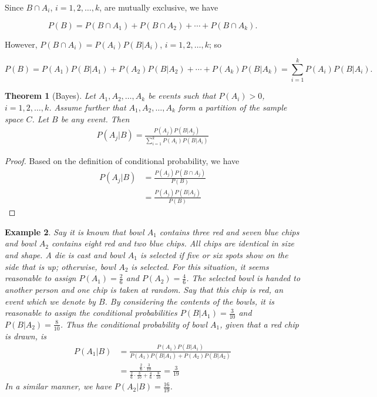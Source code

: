 \documentclass[12pt]{article}
\newtheorem{theorem}{Theorem}[section]
\newtheorem{example}[theorem]{Example}
\newcommand{\1}{{\bf 1}}
\newcommand{\2}{{\bf 2}}
\begin{document}
Since $B \cap A_i$, $i = 1, 2, \ldots, k$, are mutually exclusive, we have

\[ P(B) = P(B \cap A_1) + P(B \cap A_2) + \cdots + P(B \cap A_k). \]

However, $P(B \cap A_i) = P(A_i)P(B|A_i)$, $i = 1, 2, \ldots, k$; so

\[ P(B) = P(A_1)P(B|A_1) + P(A_2)P(B|A_2) + \cdots + P(A_k)P(B|A_k) = \sum_{i=1}^{k} P(A_i)P(B|A_i). \]

\begin{theorem}[Bayes]
Let $A_1, A_2, \ldots, A_k$ be events such that $P(A_i) > 0$, $i = 1, 2, \ldots, k$. Assume further that $A_1, A_2, \ldots, A_k$ form a partition of the sample space $C$. Let $B$ be any event. Then
\begin{align}
P(A_j|B) = \frac{P(A_j)P(B|A_j)}{\sum_{i=1}^{k} P(A_i)P(B|A_i)}
\end{align}
\end{theorem}

\begin{proof}
Based on the definition of conditional probability, we have
\begin{align}
P(A_j|B) &= \frac{P(A_j)P(B\cap A_j)}{P(B)} \\
&= \frac{P(A_j)P(B|A_j)}{P(B)}
\end{align}
\end{proof}
\begin{example}\label{bayes-example}
Say it is known that bowl $A_1$ contains three red and seven blue chips and bowl $A_2$ contains eight red and two blue chips. All chips are identical in size and shape. A die is cast and bowl $A_1$ is selected if five or six spots show on the side that is up; otherwise, bowl $A_2$ is selected. For this situation, it seems reasonable to assign $P(A_1) = \frac{2}{6}$ and $P(A_2) = \frac{4}{6}$. The selected bowl is handed to another person and one chip is taken at random. Say that this chip is red, an event which we denote by $B$. By considering the contents of the bowls, it is reasonable to assign the conditional probabilities $P(B|A_1) = \frac{3}{10}$ and $P(B|A_2) = \frac{8}{10}$. Thus the conditional probability of bowl $A_1$, given that a red chip is drawn, is
\begin{align}
P(A_1|B) &= \frac{P(A_1)P(B|A_1)}{P(A_1)P(B|A_1) + P(A_2)P(B|A_2)} \\
&= \frac{\frac{2}{6}\cdot\frac{3}{10}}{\frac{2}{6}\cdot\frac{3}{10} + \frac{4}{6}\cdot\frac{8}{10}} = \frac{3}{19}
\end{align}
In a similar manner, we have $P(A_2|B) = \frac{16}{19}$.
\end{example}
\end{document}
